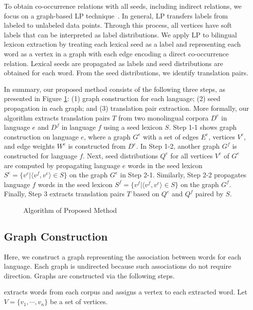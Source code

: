 \documentclass[english]{jnlp_1.4}
\begin{document}
To obtain co-occurrence relations with all seeds, including indirect relations, we focus on a graph-based LP technique~\cite{zhu02}. 
In general, LP transfers labels from labeled to unlabeled data points. 
Through this process, all vertices have soft labels that can be interpreted as label distributions. 
We apply LP to bilingual lexicon extraction by treating each lexical seed as a label and representing each word as a vertex in a graph with each edge encoding a direct co-occurrence relation. 
Lexical seeds are propagated as labels and seed distributions are obtained for each word. 
From the seed distributions, we identify translation pairs. 

In summary, our proposed method consists of the following three steps, as presented in Figure \ref{fig:algorithm}: (1) graph construction for each language; (2) seed propagation in each graph; and (3) translation pair extraction. 
More formally, our algorithm extracts translation pairs $T$ from two monolingual corpora $D^e$ in language $e$ and $D^f$ in language $f$ using a seed lexicon $S$. 
Step 1-1 shows graph construction on language $e$, where a graph $G^e$ with a set of edges $E^e$, vertices $V^e$, and edge weights $W^e$ is constructed from $D^e$. 
In Step 1-2, another graph $G^f$ is constructed for language $f$. 
Next, seed distributions $Q^e$ for all vertices $V^e$ of $G^e$ are computed by propagating language $e$ words in the seed lexicon $S^e = \{v^{e}|\langle v^{f},v^{e} \rangle \in S \}$ on the graph $G^e$ in Step 2-1. 
Similarly, Step 2-2 propagates language $f$ words in the seed lexicon $S^f = \{v^{f}|\langle v^{f}, v^{e} \rangle \in S \}$ on the graph $G^f$. 
Finally, Step 3 extracts translation pairs $T$ based on $Q^e$ and $Q^f$ paired by $S$. 

\begin{figure}[t]

\caption{Algorithm of Proposed Method}
\label{fig:algorithm}
\end{figure}



\subsection{Graph Construction}
\label{sect:construct}

Here, we construct a graph representing the association between words for each language. 
Each graph is undirected because such associations do not require direction. 
Graphs are constructed via the following steps. 

 extracts words from each corpus and assigns a vertex to each extracted word. Let $V=\{v_{1},\cdots,v_{n}\}$ be a set of vertices. 
\end{document}
